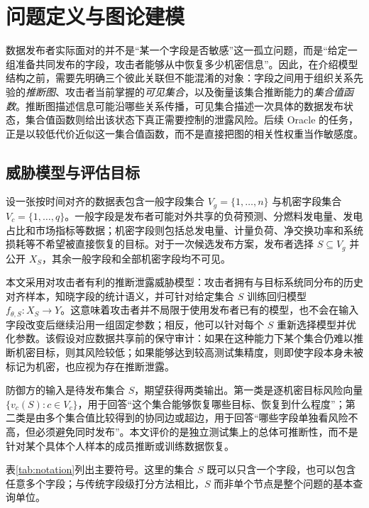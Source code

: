 \documentclass[UTF8,a4paper,zihao=5,fontset=fandol]{ctexart}
\begin{document}
\section{问题定义与图论建模}

数据发布者实际面对的并不是“某一个字段是否敏感”这一孤立问题，而是“给定一组准备共同发布的字段，攻击者能够从中恢复多少机密信息”。因此，在介绍模型结构之前，需要先明确三个彼此关联但不能混淆的对象：字段之间用于组织关系先验的\emph{推断图}、攻击者当前掌握的\emph{可见集合}，以及衡量该集合推断能力的\emph{集合值函数}。推断图描述信息可能沿哪些关系传播，可见集合描述一次具体的数据发布状态，集合值函数则给出该状态下真正需要控制的泄露风险。后续 Oracle 的任务，正是以较低代价近似这一集合值函数，而不是直接把图的相关性权重当作敏感度。

\subsection{威胁模型与评估目标}

设一张按时间对齐的数据表包含一般字段集合 $V_g=\{1,\dots,n\}$ 与机密字段集合 $V_c=\{1,\dots,q\}$。一般字段是发布者可能对外共享的负荷预测、分燃料发电量、发电占比和市场指标等数据；机密字段则包括总发电量、计量负荷、净交换功率和系统损耗等不希望被直接恢复的目标。对于一次候选发布方案，发布者选择 $S\subseteq V_g$ 并公开 $X_S$，其余一般字段和全部机密字段均不可见。

本文采用对攻击者有利的推断泄露威胁模型：攻击者拥有与目标系统同分布的历史对齐样本，知晓字段的统计语义，并可针对给定集合 $S$ 训练回归模型 $f_{\theta,S}:X_S\rightarrow Y$。这意味着攻击者并不局限于使用发布者已有的模型，也不会在输入字段改变后继续沿用一组固定参数；相反，他可以针对每个 $S$ 重新选择模型并优化参数。该假设对应数据共享前的保守审计：如果在这种能力下某个集合仍难以推断机密目标，则其风险较低；如果能够达到较高测试集精度，则即使字段本身未被标记为机密，也应视为存在推断泄露。

防御方的输入是待发布集合 $S$，期望获得两类输出。第一类是逐机密目标风险向量 $\{v_c(S):c\in V_c\}$，用于回答“这个集合能够恢复哪些目标、恢复到什么程度”；第二类是由多个集合值比较得到的协同边或超边，用于回答“哪些字段单独看风险不高，但必须避免同时发布”。本文评价的是独立测试集上的总体可推断性，而不是针对某个具体个人样本的成员推断或训练数据恢复。

表\ref{tab:notation}列出主要符号。这里的集合 $S$ 既可以只含一个字段，也可以包含任意多个字段；与传统字段级打分方法相比，$S$ 而非单个节点是整个问题的基本查询单位。
\end{document}

